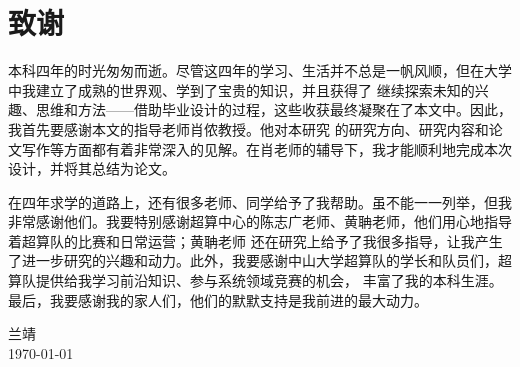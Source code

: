 
\chapter{致谢}

本科四年的时光匆匆而逝。尽管这四年的学习、生活并不总是一帆风顺，但在大学中我建立了成熟的世界观、学到了宝贵的知识，并且获得了
继续探索未知的兴趣、思维和方法——借助毕业设计的过程，这些收获最终凝聚在了本文中。因此，我首先要感谢本文的指导老师肖侬教授。他对本研究
的研究方向、研究内容和论文写作等方面都有着非常深入的见解。在肖老师的辅导下，我才能顺利地完成本次设计，并将其总结为论文。

在四年求学的道路上，还有很多老师、同学给予了我帮助。虽不能一一列举，但我非常感谢他们。我要特别感谢超算中心的陈志广老师、黄聃老师，他们用心地指导着超算队的比赛和日常运营；黄聃老师
还在研究上给予了我很多指导，让我产生了进一步研究的兴趣和动力。此外，我要感谢中山大学超算队的学长和队员们，超算队提供给我学习前沿知识、参与系统领域竞赛的机会，
丰富了我的本科生涯。最后，我要感谢我的家人们，他们的默默支持是我前进的最大动力。

\vskip 108pt
\begin{flushright}
	兰靖\makebox[1cm]{} \\
	\today
\end{flushright}

